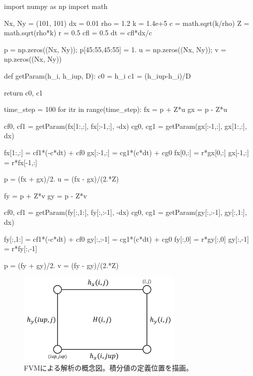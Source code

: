 \documentclass[dvipdfmx, 9pt, a4paper]{jsarticle}
\begin{document}
\begin{python}
import numpy as np
import math

Nx, Ny = (101, 101)
dx = 0.01
rho = 1.2
k = 1.4e+5
c = math.sqrt(k/rho)
Z = math.sqrt(rho*k)
r = 0.5
cfl = 0.5
dt = cfl*dx/c

p = np.zeros((Nx, Ny)); p[45:55,45:55] = 1.
u = np.zeros((Nx, Ny)); v = np.zeros((Nx, Ny))

def getParam(h_i, h_iup, D):
	c0 = h_i
	c1 = (h_iup-h_i)/D

	return c0, c1

time_step = 100
for itr in range(time_step):
	fx = p + Z*u
	gx = p - Z*u

	cf0, cf1 = getParam(fx[1:,:], fx[:-1,:], -dx)
	cg0, cg1 = getParam(gx[:-1,:], gx[1:,:], dx)

	fx[1:,:] = cf1*(-c*dt) + cf0
	gx[:-1,:] = cg1*(c*dt) + cg0
	fx[0,:] = r*gx[0,:]
	gx[-1,:] = r*fx[-1,:]

	p = (fx + gx)/2.
	u = (fx - gx)/(2.*Z)

	fy = p + Z*v
	gy = p - Z*v

	cf0, cf1 = getParam(fy[:,1:], fy[:,:-1], -dx)
	cg0, cg1 = getParam(gy[:,:-1], gy[:,1:], dx)

	fy[:,1:] = cf1*(-c*dt) + cf0
	gy[:,:-1] = cg1*(c*dt) + cg0
	fy[:,0] = r*gy[:,0]
	gy[:,-1] = r*fy[:,-1]

	p = (fy + gy)/2.
	v = (fy - gy)/(2.*Z)
\end{python}

\begin{figure}[b]
\begin{center}
\includegraphics[width=8cm]{"fig10.png"}
\caption{FVMによる解析の概念図。積分値の定義位置を描画。}
\end{center}
\end{figure}
\end{document}
